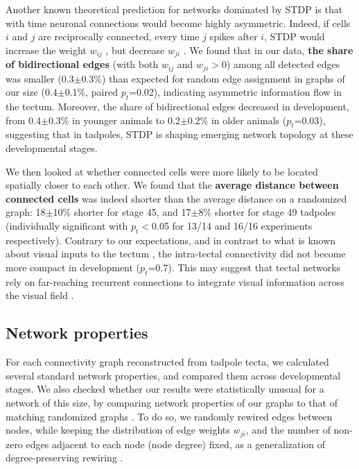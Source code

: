 \documentclass{article}
\begin{document}
Another known theoretical prediction for networks dominated by STDP \citep{pratt2008recurrent,richards2010stdp} is that with time neuronal connections would become highly asymmetric. Indeed, if cells $i$ and $j$ are reciprocally connected, every time $j$ spikes after $i$, STDP would increase the weight $w_{ij}$ , but decrease $w_{ji}$ \citep{abbott1996ltpsequence,fiete2010chains}. We found that in our data, \textbf{the share of bidirectional edges} (with both $w_{ij}$ and $w_{ji}>$0) among all detected edges was smaller (0.3$\pm$0.3\%) than expected for random edge assignment in graphs of our size (0.4$\pm$0.1\%, paired $p_t$=0.02), indicating asymmetric information flow in the tectum. Moreover, the share of bidirectional edges decreased in development, from 0.4$\pm$0.3\% in younger animals to 0.2$\pm$0.2\% in older animals ($p_t$=0.03), suggesting that in tadpoles, STDP is shaping emerging network topology at these developmental stages.

We then looked at whether connected cells were more likely to be located spatially closer to each other. We found that the \textbf{average distance between connected cells} was indeed shorter than the average distance on a randomized graph: 18$\pm$10\% shorter for stage 45, and 17$\pm$8\% shorter for stage 49 tadpoles (individually significant with $p_t<$0.05 for 13/14 and 16/16 experiments respectively). Contrary to our expectations, and in contrast to what is known about visual inputs to the tectum \citep{tao2005refinement}, the intra-tectal connectivity did not become more compact in development ($p_t$=0.7). This may suggest that tectal networks rely on far-reaching recurrent connections to integrate visual information across the visual field \citep{baginskas2009recurrent,liu2016jumbo,jang2016}.

\subsection*{Network properties}

For each connectivity graph reconstructed from tadpole tecta, we calculated several standard network properties, and compared them across developmental stages. We also checked whether our results were statistically unusual for a network of this size, by comparing network properties of our graphs to that of matching randomized graphs \citep{ansmann2012surrogate}. To do so, we randomly rewired edges between nodes, while keeping the distribution of edge weights $w_{ji}$, and the number of non-zero edges adjacent to each node (node degree) fixed, as a generalization of degree-preserving rewiring \citep{maslov2002}. 
\end{document}
